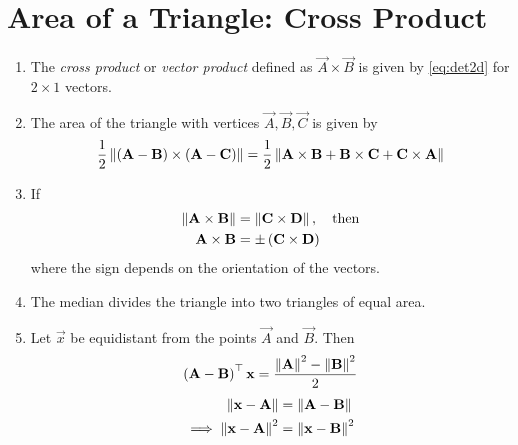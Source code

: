 \section{Area of a Triangle: Cross Product}
\begin{enumerate}[label=\thesection.\arabic*.,ref=\thesection.\theenumi]
\item The {\em cross product} or {\em vector product} defined as $\vec{A}\times \vec{B}$ is given by  
  \eqref{eq:det2d} for  $2 \times 1$ vectors.
  \iffalse
\item For  $3 \times 1$ vectors, 
\begin{align}
  \label{eq:cross3d}
	\vec{A} \times \vec{B} = \myvec{ \mydet{\vec{A}_{23} & \vec{B}_{23}} \\[10pt] \mydet{\vec{A}_{31} & \vec{B}_{31}} \\[10pt] \mydet{\vec{A}_{12}  & \vec{B}_{12}}}
\end{align}
\fi
\item The area of the triangle with vertices $\vec{A}, \vec{B}, \vec{C}$ is given by 
	\label{prop:area2d}
\begin{align}
  \label{eq:area2d}
	\frac{1}{2}\norm{\brak{\vec{A}-\vec{B}} \times \brak{\vec{A}-\vec{C}}}
 = 
 \frac{1}{2}\norm{\vec{A} \times \vec{B}+\vec{B} \times \vec{C}+\vec{C} \times \vec{A}}
  \end{align}
  \item If 
  \label{prop:area2d-norm}
\begin{align}
  \label{eq:area2d-norm}
	\norm{\vec{A}\times\vec{B}}  &= \norm{\vec{C}\times \vec{D}}, \quad \text{then}
	\\
	\vec{A}\times\vec{B}  &= \pm\brak{\vec{C}\times \vec{D}}
  \end{align}
  where the sign depends on the orientation of the vectors.
  \item The median divides the triangle into two triangles of equal area.
	  \label{prop:two-median-area}
\item Let $\vec{x}$ be equidistant from the points $\vec{A}$ and $\vec{B}$.  Then 
  \begin{align}
	  \brak{\vec{A}-\vec{B}}^{\top}{\vec{x}} 
	  =  \frac{\norm{\vec{A}}^2 - \norm{\vec{B}}^2}{2}
  \label{eq:norm2d_equidist}
  \end{align}
  \solution 
\begin{align}
	\norm{\vec{x}-\vec{A}} &=
\norm{\vec{A}-\vec{B}} 
\\
	\implies \norm{\vec{x}-\vec{A}}^2 &=
\norm{\vec{x}-\vec{B}}^2 

\end{align}
\end{enumerate}
